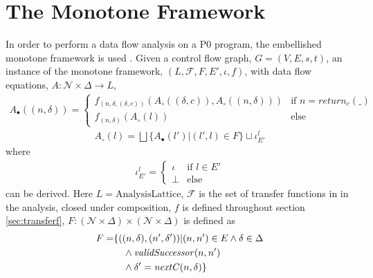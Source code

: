 \section{The Monotone Framework}
\label{sec:framework}
In order to perform a data flow analysis on a P0 program, the embellished monotone framework is used . Given a control flow graph, $G = (V,E,s,t)$, an instance of the monotone framework, $(L, \mathcal{F}, F, E', \iota, f)$, with data flow equations, $A :  \mathcal{N} \times \Delta \rightarrow L$, 
\begin{align}
	A_\bullet ((n, \delta)) = \begin{cases} 
		f_{(n, \delta, (\delta, c))}(A_\circ((\delta, c)), A_\circ((n, \delta))) &\text{if $n=\mathit{return}_c(\_)$}\\
		f_{(n, \delta)}(A_\circ(l))& \text{else}
		\end{cases}
\end{align}
\begin{align}
	A_\circ (l) = \bigsqcup \{A_\bullet(l') | (l', l) \in F\} \sqcup \iota_{E'}^l
\end{align}
where 
\begin{align}
\iota_{E'}^l = \begin{cases} \iota & \text{if }l\in E' \\  \bot &\text{else} \end{cases}
\end{align}
can be derived. Here $L = \text{AnalysisLattice}$, $\mathcal{F}$ is the set of transfer functions in in the analysis, closed under composition, $f$ is defined throughout section \ref{sec:transferf}, $F : (\mathcal{N} \times \Delta) \times (\mathcal{N} \times \Delta)$ is defined as 
\begin{align}
F = &\{((n, \delta), (n', \delta')) | (n,n') \in E \wedge\delta \in \Delta \notag\\
&\quad \wedge \mathit{validSuccessor}(n, n')\notag\\
&\quad \wedge  \delta' = \mathit{nextC}( n, \delta)\}
\end{align} 
